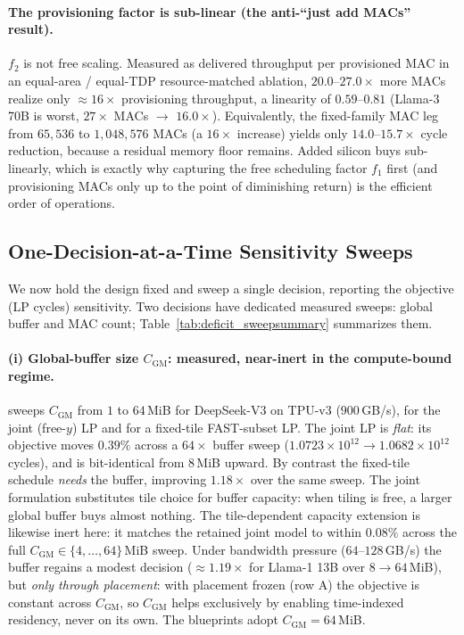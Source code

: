 \paragraph{The provisioning factor is sub-linear (the anti-``just add MACs''
result).} $f_2$ is not free scaling. Measured as delivered throughput per provisioned MAC in an equal-area / equal-TDP resource-matched ablation, $20.0$--$27.0\times$ more MACs realize only $\approx16\times$ provisioning throughput, a linearity of $\mathbf{0.59}$--$\mathbf{0.81}$ (Llama-3 70B is worst, $27\times$ MACs $\to$ $16.0\times$). Equivalently, the fixed-family MAC leg from $65{,}536$ to $1{,}048{,}576$ MACs (a $16\times$ increase) yields only $14.0$--$15.7\times$ cycle reduction, because a residual memory floor remains. Added silicon buys sub-linearly, which is exactly why capturing the free scheduling factor $f_1$ first (and provisioning MACs only up to the point of diminishing return) is the efficient order of operations. \fi

\subsection{One-Decision-at-a-Time Sensitivity Sweeps}
\label{app:deficit:sweeps}

We now hold the design fixed and sweep a single decision, reporting the objective (LP cycles) sensitivity.
Two decisions have dedicated measured sweeps: global buffer and MAC count; Table~\ref{tab:deficit_sweepsummary} summarizes them.

\paragraph{(i) Global-buffer size $C_{\mathrm{GM}}$: measured, near-inert in
the compute-bound regime.}  sweeps $C_{\mathrm{GM}}$ from $1$ to $64$\,MiB for DeepSeek-V3 on TPU-v3 ($900$\,GB/s), for the joint (free-$y$) LP and for a fixed-tile FAST-subset LP. The joint LP is \emph{flat}: its objective moves $0.39\%$ across a $64\times$ buffer sweep ($1.0723\times10^{12}\to 1.0682\times10^{12}$ cycles), and is bit-identical from $8$\,MiB upward. By contrast the fixed-tile schedule \emph{needs} the buffer, improving $1.18\times$ over the same sweep. The joint formulation substitutes tile choice for buffer capacity: when tiling is free, a larger global buffer buys almost nothing. The tile-dependent capacity extension is likewise inert here: it matches the retained joint model to within $0.08\%$ across the full $C_{\mathrm{GM}}\in\{4,\dots,64\}$\,MiB sweep. Under bandwidth pressure ($64$--$128$\,GB/s) the buffer regains a modest decision ($\approx1.19\times$ for Llama-1 13B over $8\to64$\,MiB), but \emph{only through placement}: with placement frozen (row A) the objective is constant across $C_{\mathrm{GM}}$, so $C_{\mathrm{GM}}$ helps exclusively by enabling time-indexed residency, never on its own. The blueprints adopt $C_{\mathrm{GM}}=64$\,MiB.

